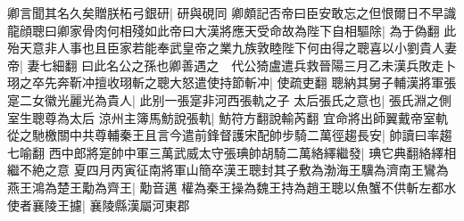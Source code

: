 卿言聞其名久矣贈朕柘弓銀研|{
	研與硯同}
卿頗記否帝曰臣安敢忘之但恨爾日不早識龍顔聰曰卿家骨肉何相殘如此帝曰大漢將應天受命故為陛下自相驅除|{
	為于偽翻}
此殆天意非人事也且臣家若能奉武皇帝之業九族敦睦陛下何由得之聰喜以小劉貴人妻帝|{
	妻七細翻}
曰此名公之孫也卿善遇之　代公猗盧遣兵救晉陽三月乙未漢兵敗走卜珝之卒先奔靳冲擅收珝斬之聰大怒遣使持節斬冲|{
	使疏吏翻}
聰納其舅子輔漢將軍張寔二女徽光麗光為貴人|{
	此别一張寔非河西張軌之子}
太后張氏之意也|{
	張氏淵之側室生聰尊為太后}
涼州主簿馬魴說張軌|{
	魴符方翻說輸芮翻}
宜命將出師翼戴帝室軌從之馳檄關中共尊輔秦王且言今遣前鋒督護宋配帥步騎二萬徑趨長安|{
	帥讀曰率趨七喻翻}
西中郎將寔帥中軍三萬武威太守張琠帥胡騎二萬絡繹繼發|{
	琠它典翻絡繹相繼不絶之意}
夏四月丙寅征南將軍山簡卒漢王聰封其子敷為渤海王驥為濟南王鸞為燕王鴻為楚王勱為齊王|{
	勱音邁}
權為秦王操為魏王持為趙王聰以魚蟹不供斬左都水使者襄陵王攄|{
	襄陵縣漢屬河東郡}


